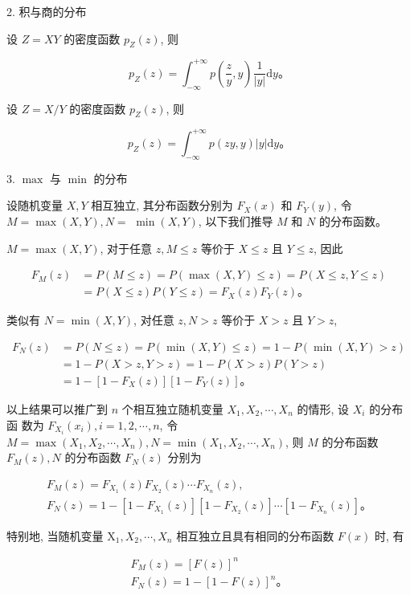 \documentclass{beamer}
\begin{document}
	\begin{frame}
		2. 积与商的分布
		
		设 $Z=X Y$ 的密度函数 $p_{Z}(z)$, 则
		
		$$
		p_{Z}(z)=\int_{-\infty}^{+\infty} p\left(\frac{z}{y}, y\right) \frac{1}{|y|} \mathrm{d} y 。
		$$
		
		设 $Z=X / Y$ 的密度函数 $p_{Z}(z)$, 则
		
		$$
		p_{Z}(z)=\int_{-\infty}^{+\infty} p(z y, y)|y| \mathrm{d} y 。
		$$
	\end{frame}
	
	\begin{frame}
		3. $\max$ 与 $\min$ 的分布
		
		设随机变量 $X, Y$ 相互独立, 其分布函数分别为 $F_{X}(x)$ 和 $F_{Y}(y)$, 令 $M=\max (X, Y), N=$ $\min (X, Y)$, 以下我们推导 $M$ 和 $N$ 的分布函数。
		
		$M=\max (X, Y)$, 对于任意 $z, M \leqslant z$ 等价于 $X \leqslant z$ 且 $Y \leqslant z$, 因此
		
		$$
		\begin{aligned}
			F_{M}(z) & =P(M \leqslant z)=P(\max (X, Y) \leqslant z)=P(X \leqslant z, Y \leqslant z) \\
			& =P(X \leqslant z) P(Y \leqslant z)=F_{X}(z) F_{Y}(z) 。
		\end{aligned}
		$$
		
		类似有 $N=\min (X, Y)$, 对任意 $z, N>z$ 等价于 $X>z$ 且 $Y>z$,
		
		$$
		\begin{aligned}
			F_{N}(z) & =P(N \leqslant z)=P(\min (X, Y) \leqslant z)=1-P(\min (X, Y)>z) \\
			& =1-P(X>z, Y>z)=1-P(X>z) P(Y>z) \\
			& =1-\left[1-F_{X}(z)\right]\left[1-F_{Y}(z)\right] 。
		\end{aligned}
		$$
	\end{frame}
	
	\begin{frame}
		以上结果可以推广到 $n$ 个相互独立随机变量 $X_{1}, X_{2}, \cdots, X_{n}$ 的情形, 设 $X_{i}$ 的分布函 数为 $F_{X_{i}}\left(x_{i}\right), i=1,2, \cdots, n$, 令 $M=\max \left(X_{1}, X_{2}, \cdots, X_{n}\right), N=\min \left(X_{1}, X_{2}, \cdots, X_{n}\right)$, 则 $M$ 的分布函数 $F_{M}(z), N$ 的分布函数 $F_{N}(z)$ 分别为
		
		$$
		\begin{gathered}
			F_{M}(z)=F_{X_{1}}(z) F_{X_{2}}(z) \cdots F_{X_{n}}(z), \\
			F_{N}(z)=1-\left[1-F_{X_{1}}(z)\right]\left[1-F_{X_{2}}(z)\right] \cdots\left[1-F_{X_{n}}(z)\right] 。
		\end{gathered}
		$$
		
		特别地, 当随机变量 $\mathrm{X}_{1}, X_{2}, \cdots, X_{n}$ 相互独立且具有相同的分布函数 $F(x)$ 时, 有
		
		$$
		\begin{gathered}
			F_{M}(z)=[F(z)]^{n} \\
			F_{N}(z)=1-[1-F(z)]^{n} 。
		\end{gathered}
		$$
	\end{frame}
	
\end{document}
